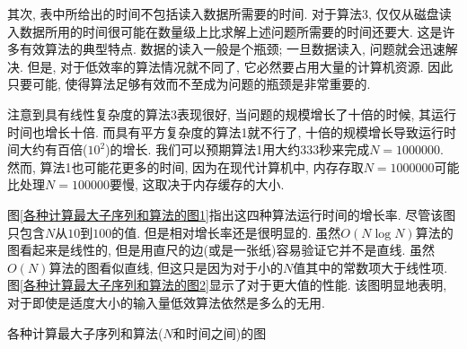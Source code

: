 \documentclass[oneside]{ctexbook}
\begin{document}
{其次, 表中所给出的时间不包括读入数据所需要的时间. 对于算法3, 仅仅从磁盘读入数据所用的时间很可能在数量级上比求解上述问题所需要的时间还要大. 这是许多有效算法的典型特点. 数据的读入一般是个瓶颈; 一旦数据读入, 问题就会迅速解决. 但是, 对于低效率的算法情况就不同了, 它必然要占用大量的计算机资源. 因此只要可能, 使得算法足够有效而不至成为问题的瓶颈是非常重要的.

注意到具有线性复杂度的算法3表现很好, 当问题的规模增长了十倍的时候, 其运行时间也增长十倍. 而具有平方复杂度的算法1就不行了, 十倍的规模增长导致运行时间大约有百倍($10^2$)的增长. 我们可以预期算法1用大约$333$秒来完成$N=1000000$. 然而, 算法1也可能花更多的时间, 因为在现代计算机中, 内存存取$N=1000000$可能比处理$N=100000$要慢, 这取决于内存缓存的大小.

图\ref{各种计算最大子序列和算法的图1}指出这四种算法运行时间的增长率. 尽管该图只包含$N$从$10$到$100$的值. 但是相对增长率还是很明显的. 虽然$O(N\log N)$算法的图看起来是线性的, 但是用直尺的边(或是一张纸)容易验证它并不是直线. 虽然$O(N)$算法的图看似直线, 但这只是因为对于小的$N$值其中的常数项大于线性项. 图\ref{各种计算最大子序列和算法的图2}显示了对于更大值的性能. 该图明显地表明, 对于即使是适度大小的输入量低效算法依然是多么的无用.

\begin{myfigure}[width=.6\textwidth, nobeforeafter, label={各种计算最大子序列和算法的图1}]{各种计算最大子序列和算法($N$和时间之间)的图}
\end{myfigure}

}
\end{document}
